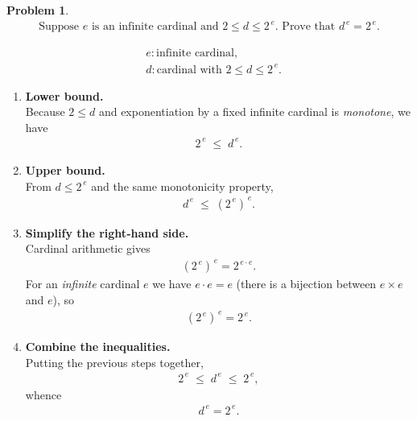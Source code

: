 \documentclass[12pt]{article}
\theoremstyle{definition} %
\newtheorem{problem}{Problem}
\theoremstyle{plain} %
\begin{document}
\begin{problem}
    \begin{align}
        \text{Suppose } e \text{ is an infinite cardinal and } 2\le d\le 2^{\,e}.
        \text{ Prove that } d^{\,e}=2^{\,e}.
    \end{align}

    \begin{align}
        &e \colon \text{infinite cardinal},\\
        &d \colon \text{cardinal with } 2\le d\le 2^{\,e}.
    \end{align}

    \begin{enumerate}
        \item \textbf{Lower bound.}\\
              Because $2\le d$ and exponentiation by a fixed infinite
              cardinal is \emph{monotone}, we have
              \begin{align}
                  2^{\,e}\;\le\;d^{\,e}.
              \end{align}

        \item \textbf{Upper bound.}\\
              From $d\le 2^{\,e}$ and the same monotonicity property,
              \begin{align}
                  d^{\,e}\;\le\;(2^{\,e})^{\,e}.
              \end{align}

        \item \textbf{Simplify the right‐hand side.}\\
              Cardinal arithmetic gives
              \begin{align}
                  (2^{\,e})^{\,e}=2^{\,e\cdot e}.
              \end{align}
              For an \emph{infinite} cardinal $e$ we have $e\cdot e=e$
              (there is a bijection between $e\times e$ and $e$), so
              \begin{align}
                  (2^{\,e})^{\,e}=2^{\,e}.
              \end{align}

        \item \textbf{Combine the inequalities.}\\
              Putting the previous steps together,
              \begin{align}
                  2^{\,e}\;\le\;d^{\,e}\;\le\;2^{\,e},
              \end{align}
              whence
              \begin{align}
                  d^{\,e}=2^{\,e}.
              \end{align}
              \qedhere
    \end{enumerate}
\end{problem}
\end{document}
